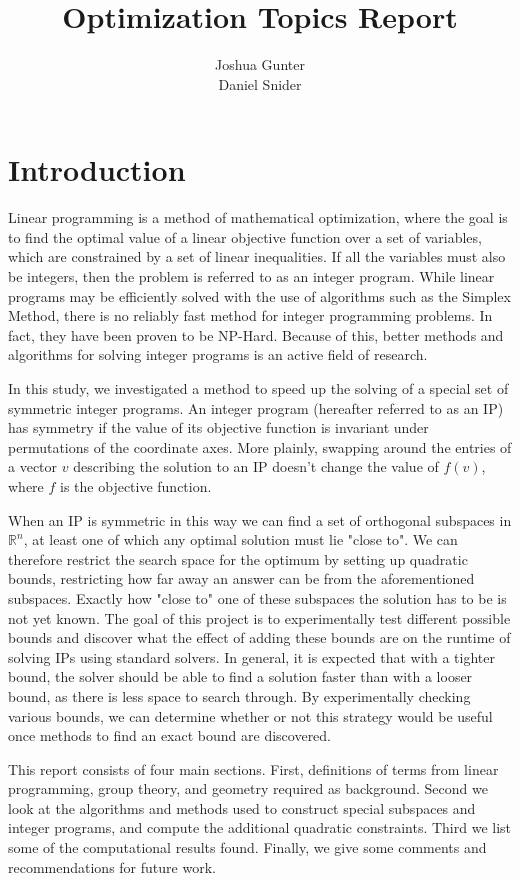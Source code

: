 \documentclass[11pt]{article} %
\title{Optimization Topics Report}
\author{Joshua Gunter\\  Daniel Snider}
\theoremstyle{definition}
\theoremstyle{remark}
\begin{document}
\maketitle

\section{Introduction}

Linear programming is a method of mathematical optimization, where the goal is to find the optimal value of a linear objective function over a set of variables, which are constrained by a set of linear inequalities. If all the variables must also be integers, then the problem is referred to as an integer program. While linear programs may be efficiently solved with the use of algorithms such as the Simplex Method, there is no reliably fast method for integer programming problems. In fact, they have been proven to be NP-Hard. Because of this, better methods and algorithms for solving integer programs is an active field of research.

In this study, we investigated a method to speed up the solving of a special set of symmetric integer programs. An integer program (hereafter referred to as an IP) has symmetry if the value of its objective function is invariant under permutations of the coordinate axes. More plainly, swapping around the entries of a vector $v$ describing the solution to an IP doesn't change the value of $f(v)$, where $f$ is the objective function.

When an IP is symmetric in this way we can find a set of orthogonal subspaces in $\mathbb{R}^n$, at least one of which any optimal solution must lie "close to". We can therefore restrict the search space for the optimum by setting up quadratic bounds, restricting how far away an answer can be from the aforementioned subspaces. Exactly how "close to" one of these subspaces the solution has to be is not yet known. The goal of this project is to experimentally test different possible bounds and discover what the effect of adding these bounds are on the runtime of solving IPs using standard solvers. In general, it is expected that with a tighter bound, the solver should be able to find a solution faster than with a looser bound, as there is less space to search through. By experimentally checking various bounds, we can determine whether or not this strategy would be useful once methods to find an exact bound are discovered.

This report consists of four main sections. First, definitions of terms from linear programming, group theory, and geometry required as background. Second we look at the algorithms and methods used to construct special subspaces and integer programs, and compute the additional quadratic constraints. Third we list some of the computational results found. Finally, we give some comments and recommendations for future work.
\end{document}
